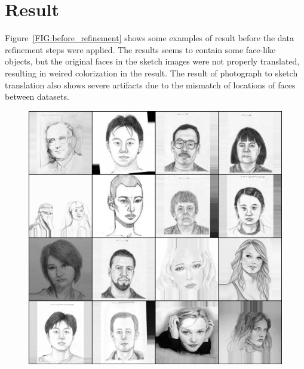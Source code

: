 \chapter{Result}\label{Ch:Result}

Figure~\ref{FIG:before_refinement} shows some examples of result before the data refinement steps were applied.
The results seems to contain some face-like objects, but the original faces in the sketch images were not properly translated, resulting in weired colorization in the result. The result of photograph to sketch translation also shows severe artifacts due to the mismatch of locations of faces between datasets.

\begin{figure}[ht]
    \begin{center}
    \includegraphics[scale=0.16]{Graphics/ske2pic_origin_before_clean.png}

\end{center}
\end{figure}
